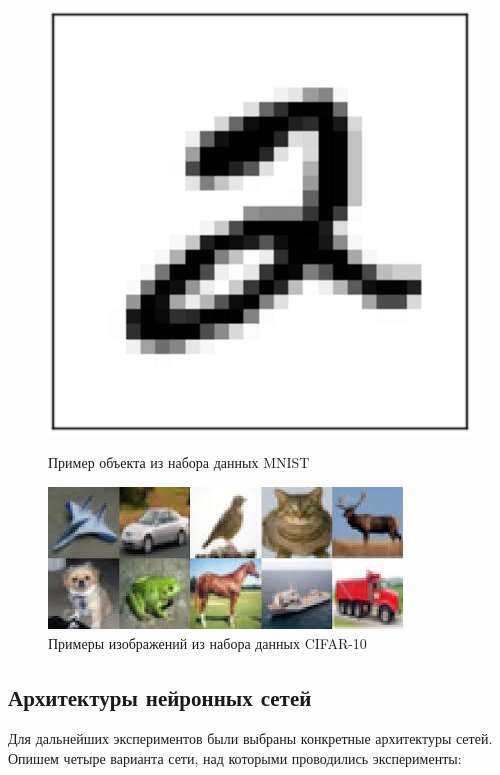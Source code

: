 \documentclass[12pt]{article}
\begin{document}
\begin{figure}[h!]
\centering
\begin{minipage}{0.45\linewidth}
\centering
\includegraphics[scale=0.3]{mnist_img.png}
\caption{Пример объекта из набора данных MNIST} \label{fig:mnist}
\end{minipage} \hfill
\begin{minipage}{0.45\linewidth}
\centering
\includegraphics[scale=0.6]{cifar_img.jpeg}
\caption{Примеры изображений из набора данных CIFAR-10} \label{fig:cifar10}
\end{minipage}
\end{figure}

\subsection{Архитектуры нейронных сетей} \label{arch}

Для дальнейших экспериментов были выбраны конкретные архитектуры сетей. Опишем четыре варианта сети, над которыми проводились эксперименты:
\end{document}
